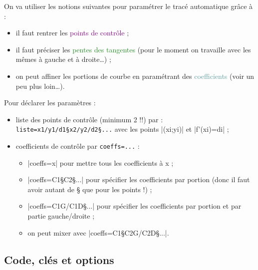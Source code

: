 \documentclass{article}
\newcommand\ctex[1]{\tcbox[vignettelatex]{#1}}
\begin{document}
\begin{codeinfo}
On va utiliser les notions suivantes pour paramétrer le tracé \og automatique \fg{} grâce à  \ctex{..controls} :
%
\begin{itemize}
	\item il faut rentrer les \textcolor{purple}{\textsf{points de contrôle}} ;
	\item il faut préciser les \textcolor{ForestGreen}{\textsf{pentes des tangentes}} (pour le moment on travaille avec les mêmes à gauche et à droite\ldots) ;
	\item on peut \og affiner \fg{} les portions de courbe en paramétrant des \textcolor{CadetBlue}{\textsf{coefficients}} (voir un peu plus loin\ldots).
\end{itemize}

\medskip

Pour déclarer les paramètres :
%
\begin{itemize}
	\item liste des points de contrôle (minimum 2 !!) par : \verb|liste=x1/y1/d1§x2/y2/d2§...| avec les points \pverb|(xi;yi)| et \vverb|f'(xi)=di| ;
	\item coefficients de contrôle par \verb|coeffs=...| :
	\begin{itemize}
		\item \averb|coeffs=x| pour mettre tous les coefficients à x ;
		\item \averb|coeffs=C1§C2§...| pour spécifier les coefficients par portion (donc il faut avoir autant de § que pour les points !) ;
		\item \averb|coeffs=C1G/C1D§...| pour spécifier les coefficients par portion et par partie gauche/droite ;
		\item on peut mixer avec \averb|coeffs=C1§C2G/C2D§...|.
	\end{itemize}
\end{itemize}
\end{codeinfo}

\subsection{Code, clés et options}

\begin{codetex}
\end{codetex}
\end{document}
